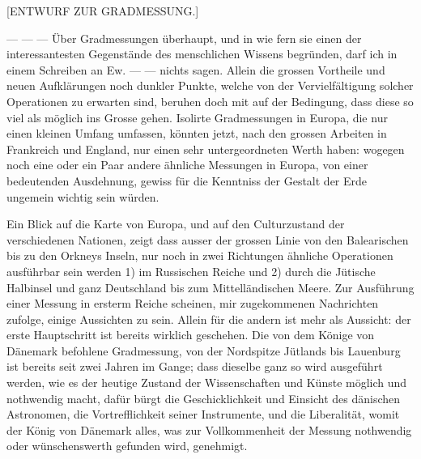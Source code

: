 \par{}\bigskip
{}%
\begin{center}\large [ENTWURF ZUR GRADMESSUNG.]\end{center}
\par
— — — Über Gradmessungen überhaupt, und in wie fern sie einen der interessantesten Gegenstände des menschlichen Wissens begründen, darf ich in einem Schreiben an Ew. — — nichts sagen. Allein die grossen Vortheile und neuen Aufklärungen noch dunkler Punkte, welche von der Vervielfältigung solcher Operationen zu erwarten sind, beruhen doch mit auf der Bedingung, dass diese so viel als möglich ins Grosse gehen. Isolirte Gradmessungen in Europa, die nur einen kleinen Umfang umfassen, könnten jetzt, nach den grossen Arbeiten in Frankreich und England, nur einen sehr untergeordneten Werth haben: wogegen noch eine oder ein Paar andere ähnliche Messungen in Europa, von einer bedeutenden Ausdehnung, gewiss für die Kenntniss der Gestalt der Erde ungemein wichtig sein würden.

Ein Blick auf die Karte von Europa, und auf den Culturzustand der verschiedenen Nationen, zeigt dass ausser der grossen Linie von den Balearischen bis zu den Orkneys Inseln, nur noch in zwei Richtungen ähnliche Operationen ausführbar sein werden 1) im Russischen Reiche und 2) durch die Jütische Halbinsel und ganz Deutschland bis zum Mittelländischen Meere. Zur Ausführung einer Messung in ersterm Reiche scheinen, mir zugekommenen Nachrichten zufolge, einige Aussichten zu sein. Allein für die andern ist mehr als Aussicht: der erste Hauptschritt ist bereits wirklich geschehen. Die von dem Könige von Dänemark befohlene Gradmessung, von der Nordspitze Jütlands bis Lauenburg ist bereits seit zwei Jahren im Gange; dass dieselbe ganz so wird ausgeführt werden, wie es der heutige Zustand der Wissenschaften und Künste möglich und nothwendig macht, dafür bürgt die Geschicklichkeit und Einsicht des dänischen Astronomen, die Vortrefflichkeit seiner Instrumente, und die Liberalität, womit der König von Dänemark alles, was zur Vollkommenheit der Messung nothwendig oder wünschenswerth gefunden wird, genehmigt.

